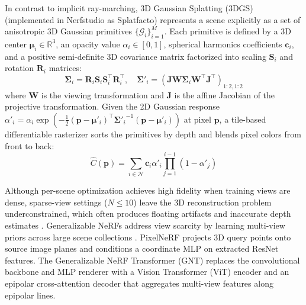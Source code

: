 In contrast to implicit ray-marching, 3D Gaussian Splatting (3DGS) \cite{kerbl3Dgaussians} (implemented in Nerfstudio as Splatfacto) represents a scene explicitly as a set of anisotropic 3D Gaussian primitives $\{\mathcal{G}_i\}_{i=1}^M$. Each primitive is defined by a 3D center $\boldsymbol{\mu}_i \in \mathbb{R}^3$, an opacity value $\alpha_i \in [0,1]$, spherical harmonics coefficients $\mathbf{c}_i$, and a positive semi-definite 3D covariance matrix factorized into scaling $\mathbf{S}_i$ and rotation $\mathbf{R}_i$ matrices:
\begin{equation}
\boldsymbol{\Sigma}_i = \mathbf{R}_i \mathbf{S}_i \mathbf{S}_i^\top \mathbf{R}_i^\top, \quad \boldsymbol{\Sigma}'_i = (\mathbf{J}\mathbf{W}\boldsymbol{\Sigma}_i\mathbf{W}^\top\mathbf{J}^\top)_{1:2,1:2}
\label{eq:3dgs_cov}
\end{equation}
where $\mathbf{W}$ is the viewing transformation and $\mathbf{J}$ is the affine Jacobian of the projective transformation. Given the 2D Gaussian response $\alpha'_i = \alpha_i \exp\!\left(-\tfrac{1}{2}(\mathbf{p}-\boldsymbol{\mu}'_i)^\top {\boldsymbol{\Sigma}'_i}^{-1} (\mathbf{p}-\boldsymbol{\mu}'_i)\right)$ at pixel $\mathbf{p}$, a tile-based differentiable rasterizer sorts the primitives by depth and blends pixel colors from front to back:
\begin{equation}
\hat{C}(\mathbf{p}) = \sum_{i \in \mathcal{N}} \mathbf{c}_i \alpha'_i \prod_{j=1}^{i-1} (1 - \alpha'_j)
\label{eq:3dgs_render}
\end{equation}

Although per-scene optimization achieves high fidelity when training views are dense, sparse-view settings ($N \le 10$) leave the 3D reconstruction problem underconstrained, which often produces floating artifacts and inaccurate depth estimates \cite{niemeyer2022regnerf, jain2021dietnerf, seo2026improvingsparseview3dgsgeneralization}. Generalizable NeRFs address view scarcity by learning multi-view priors across large scene collections \cite{yu2021pixelnerfneuralradiancefields, chen2021mvsnerffastgeneralizableradiance, wang2021ibrnet, t2023attentionnerfneeds}. PixelNeRF \cite{yu2021pixelnerfneuralradiancefields} projects 3D query points onto source image planes and conditions a coordinate MLP on extracted ResNet features. The Generalizable NeRF Transformer (GNT) \cite{t2023attentionnerfneeds} replaces the convolutional backbone and MLP renderer with a Vision Transformer (ViT) encoder and an epipolar cross-attention decoder that aggregates multi-view features along epipolar lines.

